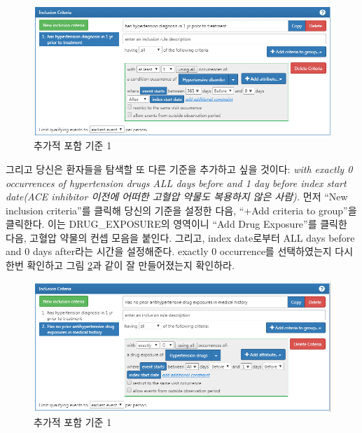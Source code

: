 \documentclass[11pt]{book}
\theoremstyle{definition}
\theoremstyle{definition}
\theoremstyle{definition}
\theoremstyle{remark}
\begin{document}
\begin{figure}

{\centering \includegraphics[width=1\linewidth]{images/Cohorts/ATLAS-IC1} 

}

\caption{추가적 포함 기준 1}\label{fig:ATLASIC1}
\end{figure}

그리고 당신은 환자들을 탐색할 또 다른 기준을 추가하고 싶을 것이다:
\emph{with exactly 0 occurrences of hypertension drugs ALL days before
and 1 day before index start date(ACE inhibitor 이전에 어떠한 고혈압
약물도 복용하지 않은 사람).} 먼저 ``New inclusion criteria''를 클릭해
당신의 기준을 설정한 다음, ``+Add criteria to group''을 클릭한다. 이는
DRUG\_EXPOSURE의 영역이니 ``Add Drug Exposure''를 클릭한 다음, 고혈압
약물의 컨셉 모음을 붙인다. 그리고, index date로부터 ALL days before and
0 days after라는 시간을 설정해준다. exactly 0 occurrence를 선택하였는지
다시 한번 확인하고 그림 \ref{fig:ATLASIC2}과 같이 잘 만들어졌는지
확인하라.

\begin{figure}

{\centering \includegraphics[width=1\linewidth]{images/Cohorts/ATLAS-IC2} 

}

\caption{추가적 포함 기준 1}\label{fig:ATLASIC2}
\end{figure}
\end{document}
